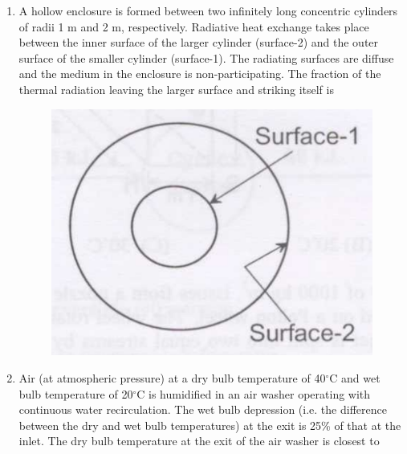 \documentclass[journal,12pt,onecolumn]{IEEEtran}
\begin{document}
\begin{enumerate}
    \item A hollow enclosure is formed between two infinitely long concentric cylinders of radii 1 m and 2 m, respectively. Radiative heat exchange takes place between the inner surface of the larger cylinder (surface-2) and the outer surface of the smaller cylinder (surface-1). The radiating surfaces are diffuse and the medium in the enclosure is non-participating. The fraction of the thermal radiation leaving the larger surface and striking itself is

          \begin{figure}[H]
              \centering
              \includegraphics[scale=0.3]{q54}
              \caption{}
              \label{q54}
          \end{figure}

          \begin{enumerate}
          \end{enumerate}

    \item Air (at atmospheric pressure) at a dry bulb temperature of 40$^\circ$C and wet bulb temperature of 20$^\circ$C is humidified in an air washer operating with continuous water recirculation. The wet bulb depression (i.e. the difference between the dry and wet bulb temperatures) at the exit is 25\% of that at the inlet. The dry bulb temperature at the exit of the air washer is closest to\\


\end{enumerate}
\end{document}

